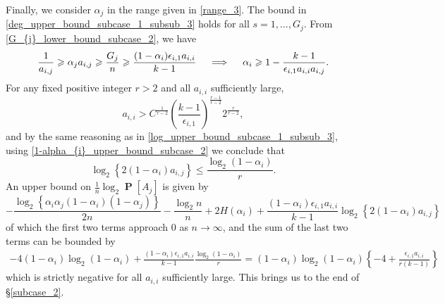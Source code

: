 \documentclass[11pt,reqno]{amsart}
\theoremstyle{definition}
\theoremstyle{remark}
\theoremstyle{conjecture}
\DeclareMathOperator{\Prob}{\mathbf{P}}
\begin{document}
Finally, we consider $\alpha_{j}$ in the range given in \eqref{range_3}. The bound in \eqref{deg_upper_bound_subcase_1_subsub_3} holds for all $s = 1, \ldots, G_{j}$. From \eqref{G_{j}_lower_bound_subcase_2}, we have
\begin{equation}\label{1-alpha_{i}_upper_bound_subcase_2}
\frac{1}{a_{i,j}} \geqslant \alpha_{j} a_{i,j} \geqslant \frac{G_{j}}{n} \geqslant \frac{(1-\alpha_{i}) \epsilon_{i,1} a_{i,i}}{k-1} \quad \implies \quad \alpha_{i} \geqslant 1 - \frac{k-1}{\epsilon_{i,1} a_{i,i} a_{i,j}}. 
\end{equation}
For any fixed positive integer $r > 2$ and all $a_{i,i}$ sufficiently large,
\begin{equation}
a_{i,i} > C^{\frac{1}{r-2}} \left(\frac{k-1}{\epsilon_{i,1}}\right)^{\frac{r-1}{r-2}} 2^{\frac{r}{r-2}}, \nonumber
\end{equation}
and by the same reasoning as in \eqref{log_upper_bound_subcase_1_subsub_3}, using \eqref{1-alpha_{i}_upper_bound_subcase_2} we conclude that
\begin{equation}
\log_{2} \left\{2 (1-\alpha_{i}) a_{i,j}\right\} \leqslant \frac{\log_{2}(1-\alpha_{i})}{r}.\nonumber
\end{equation}
An upper bound on $\frac{1}{n} \log_{2} \Prob[A_{j}]$ is given by
\begin{equation}
-\frac{\log_{2}\left\{\alpha_{i} \alpha_{j} (1-\alpha_{i}) (1-\alpha_{j})\right\}}{2n} - \frac{\log_{2} n}{n} + 2H(\alpha_{i}) + \frac{(1-\alpha_{i}) \epsilon_{i,1} a_{i,i}}{k-1} \log_{2}\left\{2 (1-\alpha_{i}) a_{i,j}\right\} \nonumber
\end{equation}
of which the first two terms approach $0$ as $n \rightarrow \infty$, and the sum of the last two terms can be bounded by
\begin{align}
-4(1-\alpha_{i}) \log_{2}(1-\alpha_{i}) + \frac{(1-\alpha_{i}) \epsilon_{i,1} a_{i,i}}{k-1} \frac{\log_{2} (1-\alpha_{i})}{r}
= (1-\alpha_{i}) \log_{2} (1-\alpha_{i}) \left\{-4 + \frac{\epsilon_{i,1} a_{i,i}}{r (k-1)}\right\} \nonumber
\end{align}
which is strictly negative for all $a_{i,i}$ sufficiently large. This brings us to the end of \S\ref{subcase_2}.
\end{document}
